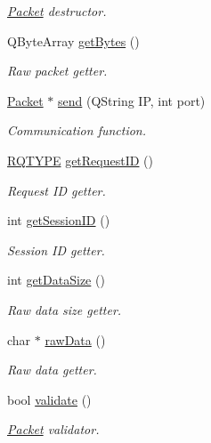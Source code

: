\begin{DoxyCompactItemize}
\begin{DoxyCompactList}\small\item\em \hyperlink{classPacket}{Packet} destructor. \end{DoxyCompactList}\item 
Q\-Byte\-Array \hyperlink{classPacket_a0a267f964f5d9bf71159103eda50fbec}{get\-Bytes} ()
\begin{DoxyCompactList}\small\item\em Raw packet getter. \end{DoxyCompactList}\item 
\hyperlink{classPacket}{Packet} $\ast$ \hyperlink{classPacket_a080da7da8230c7bec49d2bd5817cd14d}{send} (Q\-String I\-P, int port)
\begin{DoxyCompactList}\small\item\em Communication function. \end{DoxyCompactList}\item 
\hyperlink{packet_8h_a15e96d9e79cfa4c3aaba6861be4707e3}{R\-Q\-T\-Y\-P\-E} \hyperlink{classPacket_aa1e7e204d2ba664112050246d11bb86c}{get\-Request\-I\-D} ()
\begin{DoxyCompactList}\small\item\em Request I\-D getter. \end{DoxyCompactList}\item 
int \hyperlink{classPacket_a65b04ece5e53c1de54ee9315b7ff4a07}{get\-Session\-I\-D} ()
\begin{DoxyCompactList}\small\item\em Session I\-D getter. \end{DoxyCompactList}\item 
int \hyperlink{classPacket_abb2c4b6aeb0254214210ae9542574609}{get\-Data\-Size} ()
\begin{DoxyCompactList}\small\item\em Raw data size getter. \end{DoxyCompactList}\item 
char $\ast$ \hyperlink{classPacket_ac4dc8bfb2c1839018b5a2a4ddf815fdb}{raw\-Data} ()
\begin{DoxyCompactList}\small\item\em Raw data getter. \end{DoxyCompactList}\item 
bool \hyperlink{classPacket_a2c9a8531b4e1b30f22cde839b4b66744}{validate} ()
\begin{DoxyCompactList}\small\item\em \hyperlink{classPacket}{Packet} validator. \end{DoxyCompactList}\end{DoxyCompactItemize}
